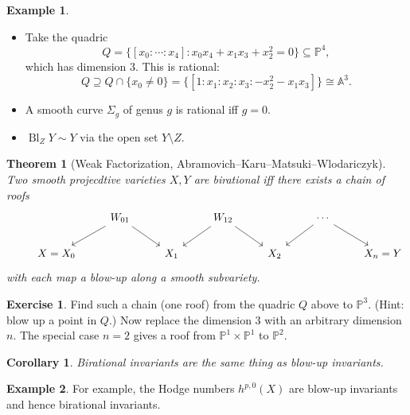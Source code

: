\documentclass{article}
\newtheorem*{theorem}{Theorem}
\newtheorem*{corollary}{Corollary}
\theoremstyle{definition}
\newtheorem*{example}{Example}
\newtheorem*{exercise}{Exercise}
\DeclareMathOperator{\Bl}{Bl}
\renewcommand{\P}{\mathbb{P}}
\newcommand{\A}{\mathbb{A}}
\begin{document}
\begin{example}
    \begin{itemize}
        \item Take the quadric
            \begin{equation*}
                Q = \{[x_0:\cdots:x_4]:x_0x_4+x_1x_3+x_2^2=0\} \subseteq \P^4,
            \end{equation*}
            which has dimension 3. This is rational:
            \begin{equation*}
                Q \supseteq Q\cap\{x_0\ne0\}
                = \{[1:x_1:x_2:x_3:-x_2^2-x_1x_3]\} \cong \A^3.
            \end{equation*}

        \item A smooth curve $\Sigma_g$ of genus $g$ is rational iff $g=0$.

        \item $\Bl_ZY\sim Y$ via the open set $Y\setminus Z$.
    \end{itemize}
\end{example}

\begin{theorem}[Weak Factorization, Abramovich--Karu--Matsuki--Wlodariczyk]
    Two smooth projecdtive varieties $X,Y$ are birational iff there exists a
    chain of roofs
    \begin{equation*}
        \begin{tikzcd}
            & &W_{01} \ar[dl] \ar[dr] & &W_{12} \ar[dl] \ar[dr] &
                &\cdots \ar[dl] \ar[dr] & \\
            &X=X_0 & &X_1 & &X_2 & &X_n=Y
        \end{tikzcd}
    \end{equation*}
    with each map a blow-up along a smooth subvariety.
\end{theorem}

\begin{exercise}
    Find such a chain (one roof) from the quadric $Q$ above to $\P^3$. (Hint:
    blow up a point in $Q$.) Now replace the dimension 3 with an arbitrary
    dimension $n$. The special case $n=2$ gives a roof from $\P^1\times\P^1$ to
    $\P^2$.
\end{exercise}

\begin{corollary}
    Birational invariants are the same thing as blow-up invariants.
\end{corollary}

\begin{example}
    For example, the Hodge numbers $h^{p,0}(X)$ are blow-up invariants and hence
    birational invariants.
\end{example}
\end{document}
